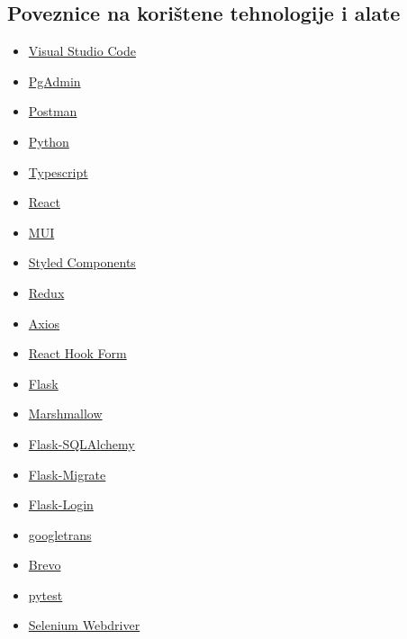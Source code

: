             \subsection{Poveznice na korištene tehnologije i alate}
            \begin{itemize}
                \item \href{https://code.visualstudio.com/}{Visual Studio Code}
                \item \href{https://www.pgadmin.org/}{PgAdmin}
                \item \href{https://www.postman.com/}{Postman}
                \item \href{https://www.python.org/}{Python}
                \item \href{https://www.typescriptlang.org/}{Typescript}
                \item \href{https://react.dev/}{React}
                \item \href{https://mui.com/}{MUI}
                \item \href{https://styled-components.com/}{Styled Components}
                \item \href{https://redux.js.org/}{Redux}
                \item \href{https://axios-http.com/docs/intro}{Axios}
                \item \href{https://react-hook-form.com/}{React Hook Form}
                \item \href{https://flask.palletsprojects.com/en/3.0.x/}{Flask}
                \item \href{https://marshmallow.readthedocs.io/en/stable/}{Marshmallow}
                \item \href{https://flask-sqlalchemy.palletsprojects.com/en/3.1.x/}{Flask-SQLAlchemy}
                \item \href{https://flask-migrate.readthedocs.io/en/latest/}{Flask-Migrate}
                \item \href{https://flask-login.readthedocs.io/en/latest/}{Flask-Login}
                \item \href{https://pypi.org/project/googletrans/}{googletrans}
                \item \href{https://www.brevo.com/}{Brevo}
                \item \href{https://docs.pytest.org/en/7.4.x/}{pytest}
                \item \href{https://www.selenium.dev/documentation/webdriver/}{Selenium Webdriver}
              \end{itemize}
			\eject 
		
